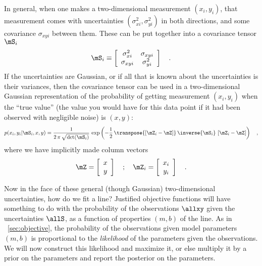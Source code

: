 \documentclass[12pt,twoside,pdftex]{article}
\begin{document}
In general, when one makes a two-dimensional measurement $(x_i,y_i)$,
that measurement comes with uncertainties $(\sigma_{xi}^2,\sigma_{yi}^2)$
in both directions, and some covariance $\sigma_{xyi}$ between them.
These can be put together into a covariance tensor $\mS_i$
\begin{equation}
\mS_i \equiv \left[\begin{array}{cc}
\sigma_{xi}^2 & \sigma_{xyi} \\ \sigma_{xyi} & \sigma_{yi}^2
\end{array}\right] \quad .
\end{equation}
If the uncertainties are Gaussian, or if all that is known about the
uncertainties is their variances, then the covariance tensor can be
used in a two-dimensional Gaussian representation of the probability
of getting measurement $(x_i,y_i)$ when the ``true value'' (the value
you would have for this data point if it had been observed with
negligible noise) is $(x,y)$:
\begin{equation}
p(x_i,y_i|\mS_i,x,y) = \frac{1}{2\,\pi\,\sqrt{\det(\mS_i)}}
  \,\exp\left(-\frac{1}{2}\,\transpose{\left[\mZ_i - \mZ\right]}
  \,\inverse{\mS_i}\,\left[\mZ_i - \mZ\right]\right) \quad ,
\end{equation}
where we have implicitly made column vectors
\begin{equation}\label{eq:mZ}
\mZ = \left[\begin{array}{c} x \\ y \end{array}\right] \quad ; \quad
\mZ_i = \left[\begin{array}{c} x_i \\ y_i \end{array}\right] \quad .
\end{equation}

Now in the face of these general (though Gaussian) two-dimensional
uncertainties, how do we fit a line?  Justified objective functions
will have something to do with the probability of the observations
$\allxy$ given the uncertainties $\allS$, as a function of properties
$(m,b)$ of the line.  As in \sectionname~\ref{sec:objective}, the
probability of the observations given model parameters $(m,b)$ is
proportional to the \emph{likelihood} of the parameters given the
observations.  We will now construct this likelihood and maximize it,
or else multiply it by a prior on the parameters and report the
posterior on the parameters.
\end{document}
